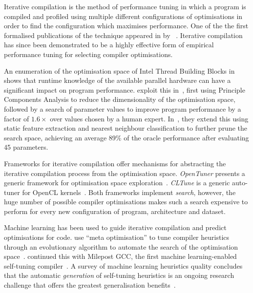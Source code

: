 
Iterative compilation is the method of performance tuning in which a program is compiled and profiled using multiple different configurations of optimisations in order to find the configuration which maximises performance. One of the the first formalised publications of the technique appeared in \citeyear{Bodin1998} by \citeauthor{Bodin1998}~\cite{din1998}.  Iterative compilation has since been demonstrated to be a highly effective form of empirical performance tuning for selecting compiler optimisations.

An enumeration of the optimisation space of Intel Thread Building Blocks in~\cite{Contreras2008} shows that runtime knowledge of the available parallel hardware can have a significant impact on program performance. \citeauthor{Collins2012} exploit this in~\cite{Collins2012}, first using Principle Components Analysis to reduce the dimensionality of the optimisation space, followed by a search of parameter values to improve program performance by a factor of $1.6\times$ over values chosen by a human expert. In~\cite{Collins2013}, they extend this using static feature extraction and nearest neighbour classification to further prune the search space, achieving an average 89\% of the oracle performance after evaluating 45 parameters.

Frameworks for iterative compilation offer mechanisms for abstracting the iterative compilation process from the optimisation space. \emph{OpenTuner} presents a generic framework for optimisation space exploration~\cite{Ansel2013}. \emph{CLTune} is a generic auto-tuner for OpenCL kernels~\cite{Nugteren2015}. Both frameworks implement \emph{search}, however, the huge number of possible compiler optimisations makes such a search expensive to perform for every new configuration of program, architecture and dataset.

Machine learning has been used to guide iterative compilation and predict optimisations for code. \citeauthor{Stephenson2003} use ``meta optimisation'' to tune compiler heuristics through an evolutionary algorithm to automate the search of the optimisation space~\cite{Stephenson2003}. \citeauthor{Fursin2011} continued this with Milepost GCC, the first machine learning-enabled self-tuning compiler~\cite{Fursin2011}. A survey of machine learning heuristics quality concludes that the automatic \emph{generation} of self-tuning heuristics is an ongoing research challenge that offers the greatest generalisation benefits~\cite{Burke2013}.

